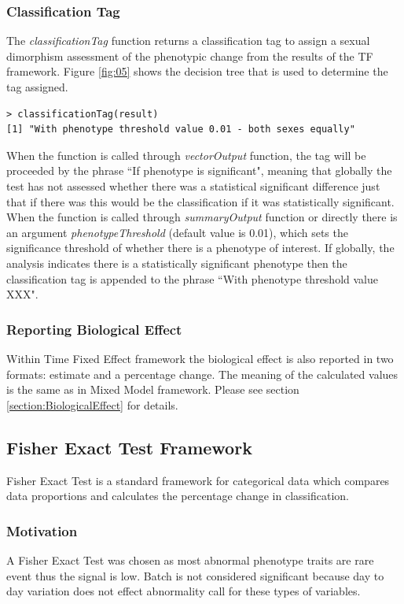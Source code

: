 \documentclass[12pt,a4paper]{article}
\begin{document}
\subsubsection{Classification Tag}
\label{TF_classificationTag}
The \textit{classificationTag} function returns a classification tag to assign a sexual dimorphism assessment of the phenotypic change from the results of the TF framework. Figure \ref{fig:05} shows the decision tree that is used to determine the tag assigned. 

\begingroup
\fontsize{8pt}{12pt}\selectfont
\begin{verbatim}
> classificationTag(result)
[1] "With phenotype threshold value 0.01 - both sexes equally"
\end{verbatim}
\endgroup

When the function is called through \textit{vectorOutput} function, the tag will be proceeded by the phrase “If phenotype is significant", meaning that globally the test has not assessed whether there was a statistical significant difference just that if there was this would be the classification if it was statistically significant. When the function is called through \textit{summaryOutput} function or directly there is an argument \textit{phenotypeThreshold} (default value is 0.01), which sets the significance threshold of whether there is a phenotype of interest. If globally, the analysis indicates there is a statistically significant phenotype then the classification tag is appended to the phrase “With phenotype threshold value XXX".

\subsubsection{Reporting Biological Effect}
Within Time Fixed Effect framework the biological effect is also reported in two formats: estimate and a percentage change. The meaning of the calculated values is the same as in Mixed Model framework. Please see section \ref{section:BiologicalEffect} for details. 
\subsection{Fisher Exact Test Framework}
\label{section:FET}
Fisher Exact Test is a standard framework for categorical data which compares data proportions and calculates the percentage change in classification. 
\subsubsection{Motivation}
A Fisher Exact Test was chosen as most abnormal phenotype traits are rare event thus the signal is low. Batch is not considered significant because day to day variation does not effect abnormality call for these types of variables.
\end{document}
